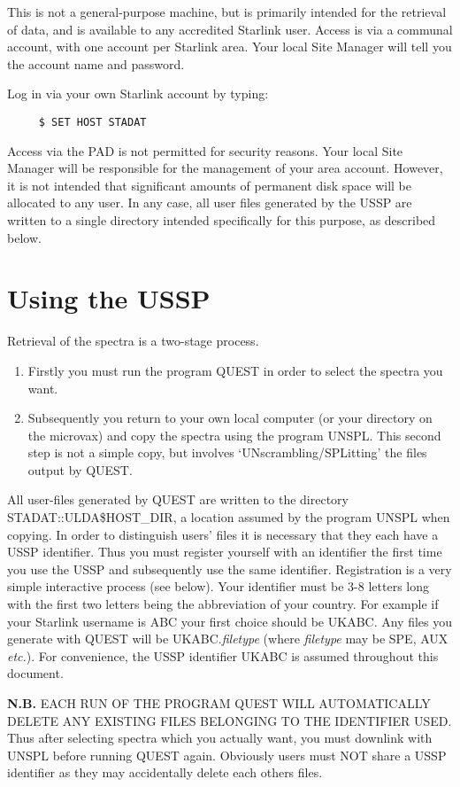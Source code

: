 This is not a general-purpose machine, but is primarily intended for the
retrieval of data, and is available to any accredited Starlink user.
Access is via a communal account, with one account 
per Starlink area.
Your local Site Manager will tell you the account name and password.

Log in via your own Starlink account by typing:
\begin{verbatim}
     $ SET HOST STADAT
\end{verbatim}
Access via the PAD is not permitted for security reasons.
Your local Site Manager will be responsible for the management
of your area account.
However, it is not intended that significant amounts of permanent
disk space will be allocated to any user.
In any case, all user files generated by the USSP are written
to a single directory intended specifically for this purpose, as described
below.

\section{Using the USSP}

Retrieval of the spectra is a two-stage process.
\begin{enumerate}
\item Firstly you must run the program QUEST in order to 
select the spectra you want.
\item Subsequently you return to your own local computer (or your
directory on the microvax) and copy the spectra
using the program UNSPL.
This second step is not a simple copy, but involves `UNscrambling/SPLitting'
the files output by QUEST.
\end{enumerate}
All user-files generated by QUEST are written to the 
directory  STADAT::ULDA\$HOST\_DIR,  a location assumed by
the program UNSPL when copying.
In order to distinguish users' files it is necessary that they each have
a USSP identifier.
Thus you must register yourself with an identifier the first time you 
use the USSP and subsequently use the same identifier.
Registration is a very simple interactive process (see below).
Your identifier must be 3-8 letters long with the first two letters
being the abbreviation of your country. 
For example if your Starlink username is  ABC your first choice 
should be UKABC.
Any files you generate with QUEST will be
UKABC.{\it filetype} (where {\it filetype} may be SPE, AUX {\it etc.}).
For convenience, the USSP identifier UKABC is assumed throughout this document.

{\bf N.B.} EACH RUN OF THE PROGRAM  QUEST WILL AUTOMATICALLY DELETE 
ANY EXISTING FILES BELONGING TO THE IDENTIFIER USED.
Thus after selecting spectra which you actually want,  you must downlink with 
UNSPL before running QUEST again. 
Obviously users must NOT share a USSP identifier as they may accidentally
delete each others files.


